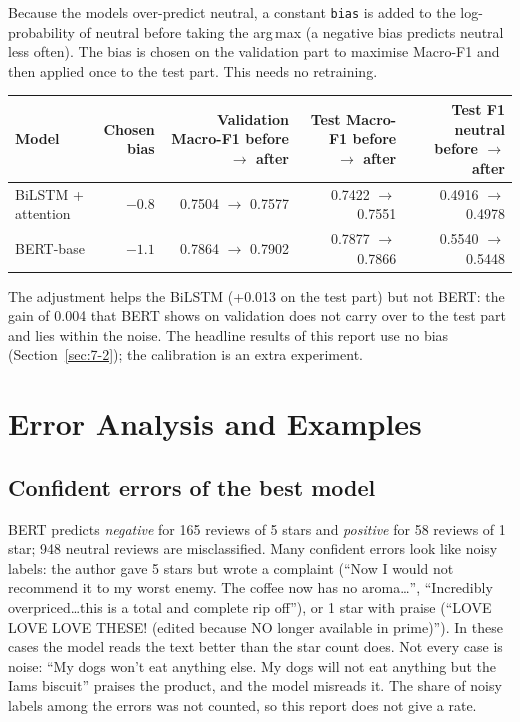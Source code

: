 Because the models over-predict neutral, a constant \texttt{bias} is added to the log-probability of neutral before taking the arg\,max (a negative bias predicts neutral less often). The bias is chosen on the validation part to maximise Macro-F1 and then applied once to the test part. This needs no retraining.

\begin{center}
\small
\begin{tabular}{@{}lrrrr@{}}
    \toprule
    Model & \shortstack[r]{Chosen\\bias} & \shortstack[r]{Validation Macro-F1\\before $\to$ after} & \shortstack[r]{Test Macro-F1\\before $\to$ after} & \shortstack[r]{Test F1 neutral\\before $\to$ after} \\
    \midrule
    BiLSTM + attention & $-0.8$ & 0.7504 $\to$ 0.7577 & 0.7422 $\to$ 0.7551 & 0.4916 $\to$ 0.4978 \\
    BERT-base & $-1.1$ & 0.7864 $\to$ 0.7902 & 0.7877 $\to$ 0.7866 & 0.5540 $\to$ 0.5448 \\
    \bottomrule
\end{tabular}
\end{center}

The adjustment helps the BiLSTM (+0.013 on the test part) but not BERT: the gain of 0.004 that BERT shows on validation does not carry over to the test part and lies within the noise. The headline results of this report use no bias (Section~\ref{sec:7-2}); the calibration is an extra experiment.

\section{Error Analysis and Examples}
\label{sec:7-8}

\subsection*{Confident errors of the best model}

BERT predicts \emph{negative} for 165 reviews of 5 stars and \emph{positive} for 58 reviews of 1 star; 948 neutral reviews are misclassified. Many confident errors look like noisy labels: the author gave 5 stars but wrote a complaint (``Now I would not recommend it to my worst enemy. The coffee now has no aroma\ldots'', ``Incredibly overpriced\ldots this is a total and complete rip off''), or 1 star with praise (``LOVE LOVE LOVE THESE! (edited because NO longer available in prime)''). In these cases the model reads the text better than the star count does. Not every case is noise: ``My dogs won't eat anything else. My dogs will not eat anything but the Iams biscuit'' praises the product, and the model misreads it. The share of noisy labels among the errors was not counted, so this report does not give a rate.

